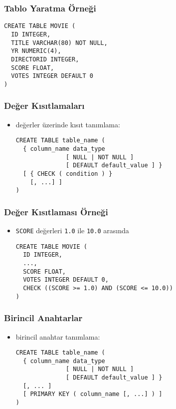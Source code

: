 \documentclass[dvipsnames]{beamer}
\theoremstyle{plain}
\begin{document}
\begin{frame}[fragile]
  \frametitle{Tablo Yaratma Örneği}

  \begin{lstlisting}
CREATE TABLE MOVIE (
  ID INTEGER,
  TITLE VARCHAR(80) NOT NULL,
  YR NUMERIC(4),
  DIRECTORID INTEGER,
  SCORE FLOAT,
  VOTES INTEGER DEFAULT 0
)
  \end{lstlisting}
\end{frame}

\begin{frame}[fragile]
  \frametitle{Değer Kısıtlamaları}

  \begin{itemize}
    \item değerler üzerinde kısıt tanımlama:
    \begin{lstlisting}
CREATE TABLE table_name (
  { column_name data_type
              [ NULL | NOT NULL ]
              [ DEFAULT default_value ] }
  [ { CHECK ( condition ) }
    [, ...] ]
)
    \end{lstlisting}
  \end{itemize}
\end{frame}

\begin{frame}[fragile]
  \frametitle{Değer Kısıtlaması Örneği}

  \begin{itemize}
    \item \texttt{SCORE} değerleri \texttt{1.0} ile \texttt{10.0} arasında
    \begin{lstlisting}
CREATE TABLE MOVIE (
  ID INTEGER,
  ...,
  SCORE FLOAT,
  VOTES INTEGER DEFAULT 0,
  CHECK ((SCORE >= 1.0) AND (SCORE <= 10.0))
)
    \end{lstlisting}
  \end{itemize}
\end{frame}

\begin{frame}[fragile]
  \frametitle{Birincil Anahtarlar}

  \begin{itemize}
    \item birincil anahtar tanımlama:
    \begin{lstlisting}
CREATE TABLE table_name (
  { column_name data_type
              [ NULL | NOT NULL ]
              [ DEFAULT default_value ] }
  [, ... ]
  [ PRIMARY KEY ( column_name [, ...] ) ]
)
    \end{lstlisting}
  \end{itemize}
\end{frame}
\end{document}
